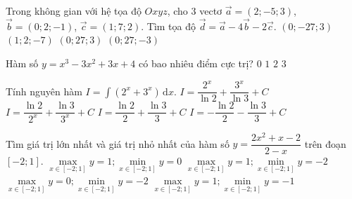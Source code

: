 \begin{ex}%
	Trong không gian với hệ tọa độ $Oxyz$, cho $3$ vectơ $\vec{a}=\left(2;-5;3\right)$, $\vec{b}=\left(0;2;-1\right)$, $\vec{c}=\left(1;7;2\right)$. Tìm tọa độ $\vec{d}=\vec{a}-4\vec{b}-2\vec{c}$.
	\choice
	{\True $\left(0;-27;3\right)$}
	{$\left(1;2;-7\right)$}
	{$\left(0;27;3\right)$}
	{$\left(0;27;-3\right)$}
\end{ex}
\begin{ex}%
	Hàm số $y=x^3-3x^2+3x+4$ có bao nhiêu điểm cực trị?
	\choice
	{\True $0$}
	{$1$}
	{$2$}
	{$3$}
\end{ex}		
\begin{ex}%
	Tính nguyên hàm $I=\displaystyle\int\limits {\left(2^x+3^x\right)\mathrm{\,d}x}$. 
	\choice
	{\True $I=\dfrac{2^x}{\ln 2}+\dfrac{3^x}{\ln 3}+C$}
	{$I=\dfrac{\ln 2}{2^x}+\dfrac{\ln 3}{3^x}+C$}
	{$I=\dfrac{\ln 2}{2}+\dfrac{\ln 3}{3}+C$}
	{$I=-\dfrac{\ln 2}{2}-\dfrac{\ln 3}{3}+C$}
\end{ex}
\begin{ex}%
	Tìm giá trị lớn nhất và giá trị nhỏ nhất của hàm số $y=\dfrac{2x^2+x-2}{2-x}$ trên đoạn $\left[-2;1\right] $. 
	\choice
	{$\max \limits_{x\in \left[-2;1\right]}y=1; \min \limits_{x\in \left[-2;1\right]}y=0 $}
	{$\max \limits_{x\in \left[-2;1\right]}y=1; \min \limits_{x\in \left[-2;1\right]}y=-2 $}
	{$\max \limits_{x\in \left[-2;1\right]}y=0; \min \limits_{x\in \left[-2;1\right]}y=-2 $}
	{\True $\max \limits_{x\in \left[-2;1\right]}y=1;\min \limits_{x\in \left[-2;1\right]}y=-1 $}
\end{ex} 

